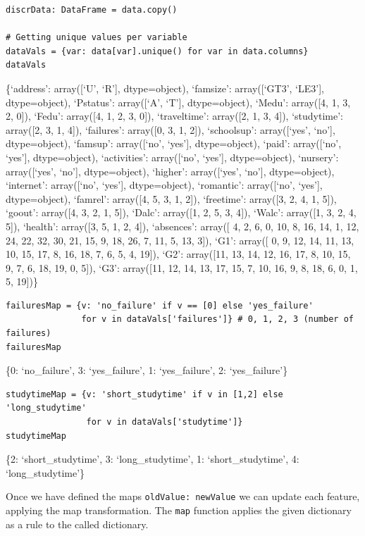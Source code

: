 \documentclass[
]{article}
\begin{document}
\begin{verbatim}
discrData: DataFrame = data.copy()

# Getting unique values per variable
dataVals = {var: data[var].unique() for var in data.columns}
dataVals
\end{verbatim}

\{`address': array({[}`U', `R'{]}, dtype=object), `famsize':
array({[}`GT3', `LE3'{]}, dtype=object), `Pstatus': array({[}`A',
`T'{]}, dtype=object), `Medu': array({[}4, 1, 3, 2, 0{]}), `Fedu':
array({[}4, 1, 2, 3, 0{]}), `traveltime': array({[}2, 1, 3, 4{]}),
`studytime': array({[}2, 3, 1, 4{]}), `failures': array({[}0, 3, 1,
2{]}), `schoolsup': array({[}`yes', `no'{]}, dtype=object), `famsup':
array({[}`no', `yes'{]}, dtype=object), `paid': array({[}`no', `yes'{]},
dtype=object), `activities': array({[}`no', `yes'{]}, dtype=object),
`nursery': array({[}`yes', `no'{]}, dtype=object), `higher':
array({[}`yes', `no'{]}, dtype=object), `internet': array({[}`no',
`yes'{]}, dtype=object), `romantic': array({[}`no', `yes'{]},
dtype=object), `famrel': array({[}4, 5, 3, 1, 2{]}), `freetime':
array({[}3, 2, 4, 1, 5{]}), `goout': array({[}4, 3, 2, 1, 5{]}), `Dalc':
array({[}1, 2, 5, 3, 4{]}), `Walc': array({[}1, 3, 2, 4, 5{]}),
`health': array({[}3, 5, 1, 2, 4{]}), `absences': array({[} 4, 2, 6, 0,
10, 8, 16, 14, 1, 12, 24, 22, 32, 30, 21, 15, 9, 18, 26, 7, 11, 5, 13,
3{]}), `G1': array({[} 0, 9, 12, 14, 11, 13, 10, 15, 17, 8, 16, 18, 7,
6, 5, 4, 19{]}), `G2': array({[}11, 13, 14, 12, 16, 17, 8, 10, 15, 9, 7,
6, 18, 19, 0, 5{]}), `G3': array({[}11, 12, 14, 13, 17, 15, 7, 10, 16,
9, 8, 18, 6, 0, 1, 5, 19{]})\}

\begin{verbatim}
failuresMap = {v: 'no_failure' if v == [0] else 'yes_failure'
               for v in dataVals['failures']} # 0, 1, 2, 3 (number of failures)
failuresMap
\end{verbatim}

\{0: `no\_failure', 3: `yes\_failure', 1: `yes\_failure', 2:
`yes\_failure'\}

\begin{verbatim}
studytimeMap = {v: 'short_studytime' if v in [1,2] else 'long_studytime'
                for v in dataVals['studytime']}
studytimeMap
\end{verbatim}

\{2: `short\_studytime', 3: `long\_studytime', 1: `short\_studytime', 4:
`long\_studytime'\}

Once we have defined the maps
\texttt{{oldValue: newValue}} we can update each feature,
applying the map transformation. The \texttt{map} function
applies the given dictionary as a rule to the called dictionary.
\end{document}
